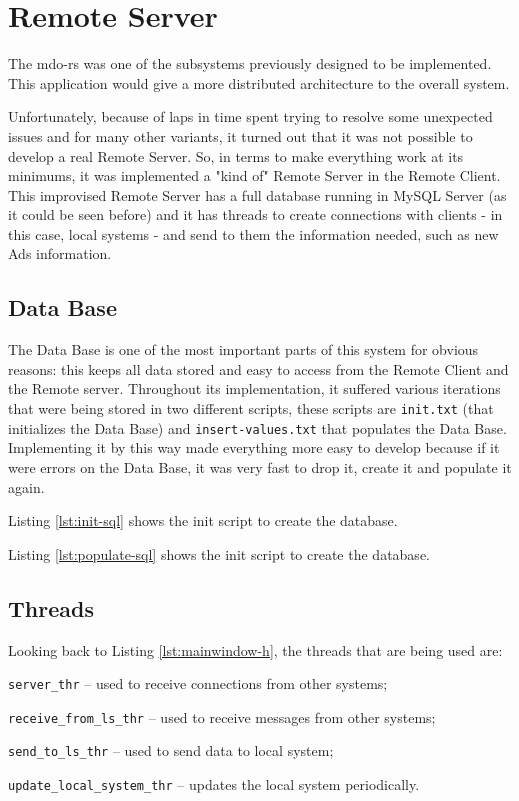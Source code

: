 \section{Remote Server}
\label{sec:rs}
%
The \gls{mdo-rs} was one of the subsystems previously designed to be implemented.
This application would give a more distributed architecture to the overall system.

Unfortunately, because of laps in time spent trying to resolve some unexpected issues and for many other variants, it turned out that it was not possible to develop a real Remote Server.
So, in terms to make everything work at its minimums, it was implemented a "kind of" Remote Server in the Remote Client.
This improvised Remote Server has a full database running in MySQL Server (as it could be seen before) and it has threads to create connections with clients - in this case, local systems - and send to them the information needed, such as new Ads information.

\subsection{Data Base}
The Data Base is one of the most important parts of this system for obvious reasons: this keeps all data stored and easy to access from the Remote Client and the Remote server.
Throughout its implementation, it suffered various iterations that were being stored in two different scripts, these scripts are \texttt{init.txt} (that initializes the Data Base) and \texttt{insert-values.txt} that populates the Data Base.
Implementing it by this way made everything more easy to develop because if it were errors on the Data Base, it was very fast to drop it, create it and populate it again.

Listing \ref{lst:init-sql} shows the init script to create the database.
%
%

Listing \ref{lst:populate-sql} shows the init script to create the database.
%
%

 

\subsection{Threads}
Looking back to Listing \ref{lst:mainwindow-h}, the threads that are being used are:
\begin{item-c}
\item \texttt{server\_thr} -- used to receive connections from other systems;
\item \texttt{receive\_from\_ls\_thr} -- used to receive messages from other systems;
\item \texttt{send\_to\_ls\_thr} -- used to send data to local system;
\item \texttt{update\_local\_system\_thr} -- updates the local system periodically.
\end{item-c}

